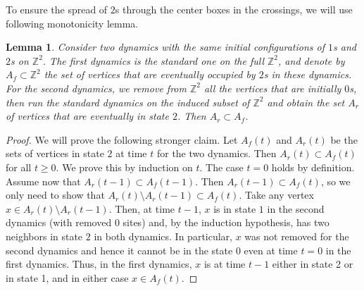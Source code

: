\documentclass{article}
\newcommand{\bZ}{{\mathbb Z}}
\numberwithin{equation}{section}
\newtheorem{lemma}[theorem]{Lemma}
\newcommand{\note}[1]{{\bf \textcolor{blue}
{[#1\marginpar{\textcolor{red}{***}}]}}}
\begin{document}
To ensure the spread of $2$s through the center boxes in the crossings, we 
will use following monotonicity lemma.

\begin{lemma}\label{lem:remove0s}
    Consider two dynamics with the same initial configurations of $1$s and $2$s on $\bZ^2$. 
    The first dynamics is the standard one on the full $\bZ^2$, and denote by $A_f\subset \bZ^2$ the set of vertices that are eventually occupied by $2$s in these dynamics. 
    For the second dynamics, we remove from $\bZ^2$ all the vertices that are initially $0$s, then run the standard dynamics on the induced subset of $\bZ^2$ and obtain the set $A_r$ of vertices that are eventually in state $2$. 
    Then $A_r\subset A_f$.
\end{lemma}
\begin{proof}
We will prove the following stronger claim.
Let $A_f(t)$ and $A_r(t)$ be the sets of vertices in state $2$ at time $t$ for the two dynamics. 
Then $A_r(t)\subset A_f(t)$ for all $t\ge 0$. We prove this by 
induction on $t$. The case $t=0$ holds by definition. Assume now that $A_r(t-1)\subset A_f(t-1)$. Then $A_r(t-1)\subset A_f(t)$, so we only need 
to show that $A_r(t)\setminus A_r(t-1)\subset A_f(t)$. 
Take any vertex $x\in A_r(t)\setminus A_r(t-1)$.  Then, at time $t-1$, $x$ is in state $1$ in the second dynamics (with removed $0$ sites) and, by the induction hypothesis, has two neighbors in state 
$2$ in both dynamics. In particular, $x$ was not removed for the second dynamics and hence it cannot be in the state $0$ even at time $t=0$ in the first dynamics. Thus, in the first dynamics, $x$ is at time $t-1$ either in state 2 or in state 1, and in either case $x\in A_f(t)$.
\end{proof}
\end{document}
